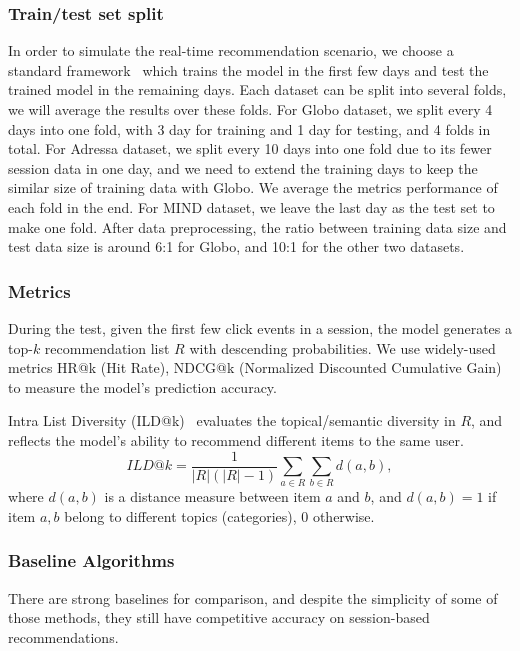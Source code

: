 \subsubsection{Train/test set split}
In order to simulate the real-time recommendation 
scenario, we choose a standard framework~\cite{jugovac_streamingrec:_2018} 
which trains the model in the first few days and test the trained model in the remaining
days. Each dataset can be split into several folds, 
we will average the results over these folds.
For Globo dataset, we split every 4 days into one fold, with 3 day for training and 1 day for testing, and 4 folds in total. 
For Adressa dataset, we split every 10 days into one fold due to its fewer session data in one day, and we need to extend the training days to keep the similar size of training data with Globo. 
We average the metrics performance of each fold in the end. For MIND dataset, we leave the last day as the test set to make one fold. 
After data preprocessing, the ratio between training data size and test data size 
is around 6:1 for Globo, and 10:1 for the other two datasets. 


\subsubsection{Metrics}
During the test, given the first few click events in a session, the model generates 
a top-$k$ recommendation list $R$ with descending probabilities. 
We use widely-used metrics HR@k (Hit Rate), NDCG@k (Normalized Discounted Cumulative Gain) to 
measure the model's prediction accuracy.

Intra List Diversity (ILD@k)~\cite{symeonidis2020session} evaluates the topical/semantic 
diversity in $R$, and reflects the model's ability to recommend different items to the same user. 
\begin{equation}
  ILD@k = \frac{1}{|R|(|R|-1)}\sum_{a\in R}\sum_{b\in R}d(a,b),
\end{equation}
where $d(a, b)$ is a distance measure between item $a$ and $b$, and 
$d(a, b) = 1$ if item $a, b$ belong to different topics (categories), 0 otherwise.

\subsubsection{Baseline Algorithms}
There are strong baselines for comparison, and despite the simplicity of some of those methods, they still have competitive accuracy on session-based recommendations.

